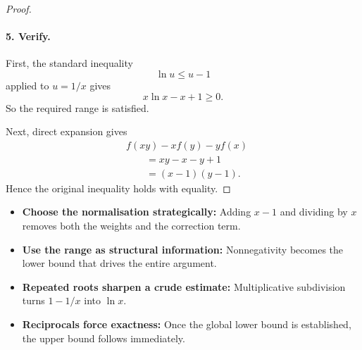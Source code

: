 \begin{dlsummary}[title={\bfseries Solution 61. The Hidden Entropy Function},breakable]
\begin{proof}
\paragraph{5. Verify.}

First, the standard inequality
\[
\ln u\le u-1
\]
applied to \(u=1/x\) gives
\[
x\ln x-x+1\ge0.
\]
So the required range is satisfied.

Next, direct expansion gives
\[
\begin{aligned}
&f(xy)-xf(y)-yf(x)\\
&\qquad=xy-x-y+1\\
&\qquad=(x-1)(y-1).
\end{aligned}
\]
Hence the original inequality holds with equality.
\end{proof}
\end{dlsummary}

\begin{takeaways}
\begin{itemize}
\item \textbf{Choose the normalisation strategically:} Adding \(x-1\) and dividing by \(x\) removes both the weights and the correction term.
\item \textbf{Use the range as structural information:} Nonnegativity becomes the lower bound that drives the entire argument.
\item \textbf{Repeated roots sharpen a crude estimate:} Multiplicative subdivision turns \(1-1/x\) into \(\ln x\).
\item \textbf{Reciprocals force exactness:} Once the global lower bound is established, the upper bound follows immediately.
\end{itemize}
\end{takeaways}
